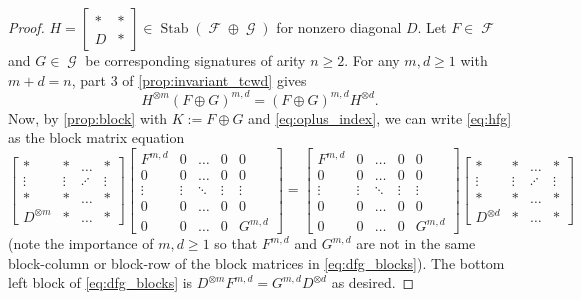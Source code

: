 \documentclass{theoretics}
\DeclareMathOperator{\fc}{\mathcal{F}}
\DeclareMathOperator{\gc}{\mathcal{G}}
\DeclareMathOperator{\stab}{Stab}
\begin{document}
\begin{proof}
    $H = \begin{bmatrix} * & * \\ D & * \end{bmatrix} \in \stab(\fc \oplus \gc)$ for nonzero diagonal
    $D$. 
    Let $F \in \fc$ and $G \in \gc$ be corresponding signatures of arity $n \geq 2$. 
    For any $m,d \geq 1$ with $m+d = n$, part 3 of \autoref{prop:invariant_tcwd} gives
    \begin{equation}
        \label{eq:hfg}
        H^{\otimes m}(F \oplus G)^{m,d} = (F \oplus G)^{m,d}H^{\otimes d}.
    \end{equation}
    Now, by \autoref{prop:block} with $K := F \oplus G$ and \eqref{eq:oplus_index},
    we can write \eqref{eq:hfg} as the block matrix equation
    \begin{equation}
        \begin{bmatrix} 
            * & * & \ldots & *\\
            \vdots & \vdots & \iddots & \vdots\\
            * & * & \ldots & *\\
            D^{\otimes m} & * & \ldots & *
        \end{bmatrix}
        \begin{bmatrix} 
            F^{m,d} & 0 & \ldots & 0 & 0\\
            0 & 0 &\ldots & 0 & 0\\
            \vdots & \vdots & \ddots & \vdots & \vdots\\
            0 & 0 &\ldots & 0 & 0\\
            0 & 0 & \ldots & 0 & G^{m,d}
        \end{bmatrix}
        =
         \begin{bmatrix} 
            F^{m,d} & 0 & \ldots & 0 & 0\\
            0 & 0 &\ldots & 0 & 0\\
            \vdots & \vdots & \ddots & \vdots & \vdots\\
            0 & 0 &\ldots & 0 & 0\\
            0 & 0 & \ldots & 0 & G^{m,d}
        \end{bmatrix}           
        \begin{bmatrix} 
            * & * & \ldots & * \\
            \vdots & \vdots & \iddots & \vdots \\
            * & * & \ldots & *\\
            D^{\otimes d} & * & \ldots & *
        \end{bmatrix}
        \label{eq:dfg_blocks}
    \end{equation}
    (note the importance of $m,d \geq 1$ so that $F^{m,d}$ and $G^{m,d}$ are not in the same
    block-column or block-row of the block matrices in \eqref{eq:dfg_blocks}).
    The bottom left block of \eqref{eq:dfg_blocks} is
    $D^{\otimes m} F^{m,d} = G^{m,d} D^{\otimes d}$ as desired.
\end{proof}
\end{document}
